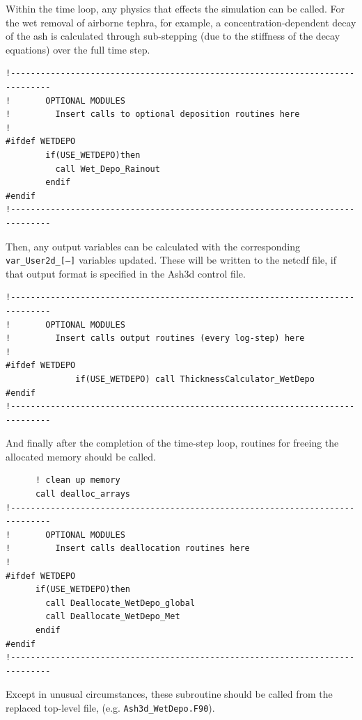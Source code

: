 Within the time loop, any physics that effects the simulation can be called.
For the wet removal of airborne tephra, for example, a concentration-dependent
decay of the ash is calculated through sub-stepping (due to the stiffness of the
decay equations) over the full time step.
\small
\begin{verbatim}
!------------------------------------------------------------------------------
!       OPTIONAL MODULES
!         Insert calls to optional deposition routines here
!
#ifdef WETDEPO
        if(USE_WETDEPO)then
          call Wet_Depo_Rainout
        endif
#endif
!------------------------------------------------------------------------------
\end{verbatim}
\normalsize
Then, any output variables can be calculated with the corresponding
\texttt{var\_User2d\_[---]} variables updated. These will be written to the
netcdf file, if that output format is specified in the Ash3d control file.

\small
\begin{verbatim}
!------------------------------------------------------------------------------
!       OPTIONAL MODULES
!         Insert calls output routines (every log-step) here
!
#ifdef WETDEPO
              if(USE_WETDEPO) call ThicknessCalculator_WetDepo
#endif
!------------------------------------------------------------------------------
\end{verbatim}
\normalsize
And finally after the completion of the time-step loop, routines for freeing
the allocated memory should be called.
\small
\begin{verbatim}
      ! clean up memory
      call dealloc_arrays
!------------------------------------------------------------------------------
!       OPTIONAL MODULES
!         Insert calls deallocation routines here
!
#ifdef WETDEPO
      if(USE_WETDEPO)then
        call Deallocate_WetDepo_global
        call Deallocate_WetDepo_Met
      endif
#endif
!------------------------------------------------------------------------------
\end{verbatim}
\normalsize

Except in unusual circumstances, these subroutine should be called from the
replaced top-level file, (e.g. \texttt{Ash3d\_WetDepo.F90}).

